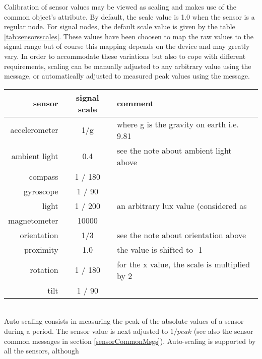 \label{sensorCalibration}

Calibration of sensor values may be viewed as scaling and makes use of the common object's  attribute. By default, the scale value is 1.0 when the sensor is a regular node. For signal nodes, the default scale value is given by the table \ref{tab:sensorsscales}. These values have been choosen to map the raw values to the signal range but of course this mapping depends on the device and may greatly vary. In order to accommodate these variations but also to cope with different requirements, scaling can be manually adjusted to any arbitrary value using the  message, or automatically adjusted to measured peak values using the  message. 


\begin{table*}[htbp]
\begin{center}
\begin{tabular}{rcl}
\hline
sensor & signal scale 	&  comment \\
\hline
accelerometer	& 1/g 		& where g is the gravity on earth i.e. 9.81 \\
ambient light	& 0.4 		& see the note about ambient light above \\
compass			& 1 / 180 	& \\
gyroscope		& 1 / 90 	& \\
light			& 1 / 200 	& an arbitrary lux value (considered as 		\\
magnetometer	& 10000 	& \\
orientation		& 1/3 		& see the note about orientation above \\
proximity		& 1.0 		& the \OSC{false} value is shifted to -1 \\
rotation		& 1 / 180 	& for the x value, the scale is multiplied by 2 \\
tilt			& 1 / 90 	& \\
\hline
\end{tabular}
\end{center}
\label{tab:sensorsscales}
\caption{Sensor as signal default scaling}
\end{table*}

\\
Auto-scaling consists in measuring the peak of the absolute values of a sensor during a period. The sensor  value is next adjusted to $1 / peak$ (see also the sensor common messages in section \ref{sensorCommonMsgs}). Auto-scaling is supported by all the sensors, although 



